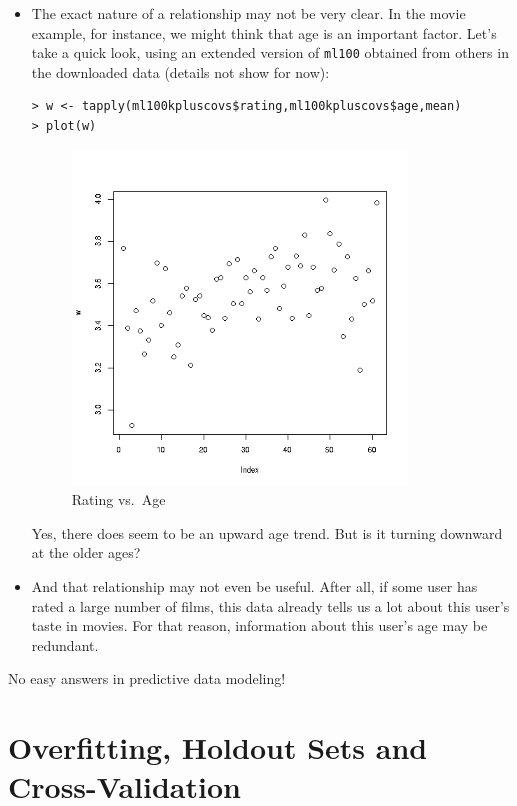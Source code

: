\begin{itemize}

\item The exact nature of a relationship may not be very clear.  In the
movie example, for instance, we might think that age is an important
factor.  Let's take a quick look, using an extended version of
\lstinline{ml100} obtained from others in the downloaded data (details
not show for now):

\begin{lstlisting}
> w <- tapply(ml100kpluscovs$rating,ml100kpluscovs$age,mean)
> plot(w)
\end{lstlisting}

\begin{figure}[tp]
\includegraphics[width=3.5in]{Images/MeanRatVsAge.png} 
\caption{Rating vs.\ Age}
\label{mightlintrend}
\end{figure}

Yes, there does seem to be an upward age trend.  But is it turning
downward at the older ages?

\item And that relationship may not even be useful.  After all, if some
user has rated a large number of films, this data already tells us a lot
about this user's taste in movies.  For that reason, information about
this user's age may be redundant.

\end{itemize} 

No easy answers in predictive data modeling!

\section{Overfitting, Holdout Sets and Cross-Validation}

